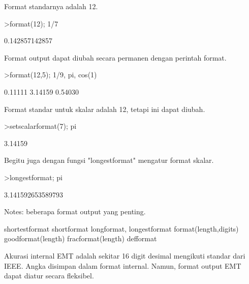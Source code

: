 \documentclass[a4paper,10pt]{article}
\begin{document}
\begin{eulernotebook}
\begin{eulercomment}
\begin{eulercomment}
\begin{eulercomment}
Format standarnya adalah 12.

\end{eulercomment}
\begin{eulerprompt}
>format(12); 1/7
\end{eulerprompt}
\begin{euleroutput}
  0.142857142857
\end{euleroutput}
\begin{eulercomment}
Format output dapat diubah secara permanen dengan perintah format.
\end{eulercomment}
\begin{eulerprompt}
>format(12,5); 1/9, pi, cos(1)
\end{eulerprompt}
\begin{euleroutput}
      0.11111 
      3.14159 
      0.54030 
\end{euleroutput}
\begin{eulercomment}
Format standar untuk skalar adalah 12, tetapi ini dapat diubah.
\end{eulercomment}
\begin{eulerprompt}
>setscalarformat(7); pi
\end{eulerprompt}
\begin{euleroutput}
      3.14159 
\end{euleroutput}
\begin{eulercomment}
Begitu juga dengan fungsi "longestformat" mengatur format skalar.
\end{eulercomment}
\begin{eulerprompt}
>longestformat; pi
\end{eulerprompt}
\begin{euleroutput}
  3.141592653589793
\end{euleroutput}
\begin{eulercomment}
Notes: beberapa format output yang penting.

\end{eulercomment}
\begin{eulerttcomment}
 shortestformat shortformat longformat, longestformat
 format(length,digits) goodformat(length)
 fracformat(length)
 defformat
\end{eulerttcomment}
\begin{eulercomment}

Akurasi internal EMT adalah sekitar 16 digit desimal mengikuti standar
dari IEEE. Angka disimpan dalam format internal. Namun, format output
EMT dapat diatur secara fleksibel.


\end{eulercomment}
\end{eulercomment}
\end{eulercomment}
\end{eulernotebook}
\end{document}
